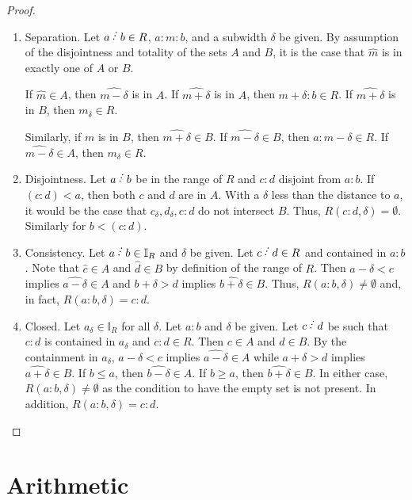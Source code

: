 \documentclass[12pt]{article}
\begin{document}
\begin{proof}
\begin{enumerate}
        \item Separation. Let $a\lte b \in R$, $a:m:b$, and a subwidth $\delta $ be given.  By assumption of the disjointness and totality of the sets $A$ and $B$, it is the case that $\widehat{m}$ is in exactly one of $A$ or $B$.
        
        If $\widehat{m} \in A$, then $\widehat{m-\delta}$ is in $A$. If $\widehat{m+\delta}$ is in $A$, then $m+\delta:b \in R$. If $\widehat{m+\delta}$ is in $B$, then $m_\delta \in R$.

        Similarly, if $m$ is in $B$, then $\widehat{m+\delta} \in B$. If $\widehat{m-\delta} \in B$, then $a:m-\delta \in R$. If $\widehat{m-\delta} \in A$, then $m_\delta \in R$.

        \item Disjointness. Let $a \lte b$ be in the range of $R$ and $c : d$ disjoint from $a:b$. If $(c:d) < a$, then both $c$ and $d$ are in $A$. With a $\delta$ less than the distance to $a$, it would be the case that $c_\delta, d_\delta, c:d$ do not intersect $B$. Thus, $R(c:d, \delta) = \emptyset$. Similarly for $b < (c:d)$. 
         
        \item Consistency. Let $a \lte b \in \mathbb{I}_R$ and $\delta$ be given. Let $c \lte d \in R$ and contained in $a:b$. Note that $\widehat{c} \in A$ and $\widehat{d} \in B$ by definition of the range of $R$. Then $a- \delta < c$ implies $\widehat{a - \delta} \in A$ and $b + \delta > d$ implies $\widehat{b+\delta} \in B$. Thus, $R(a:b, \delta) \neq \emptyset$ and, in fact, $R(a:b, \delta) = c:d$.
        
        \item Closed. Let $a_\delta \in \mathbb{I}_R$ for all $\delta$. Let $a:b$ and $\delta$ be given. Let $c \lte d$ be such that $c:d$ is contained in $a_\delta$ and $c:d \in R$. Then $c \in A$ and $d \in B$. By the containment in $a_\delta$, $a- \delta < c$ implies $\widehat{a-\delta} \in A$ while $a + \delta > d$ implies $\widehat{a+\delta} \in B$. If $b \leq a$, then $\widehat{b-\delta} \in A$. If $b \geq a$, then $\widehat{b+\delta} \in B$. In either case, $R(a:b, \delta) \neq \emptyset$ as the condition to have the empty set is not present. In addition, $R(a:b, \delta) = c:d$. 
    \end{enumerate}
    
\end{proof}


\section{Arithmetic}
\end{document}
